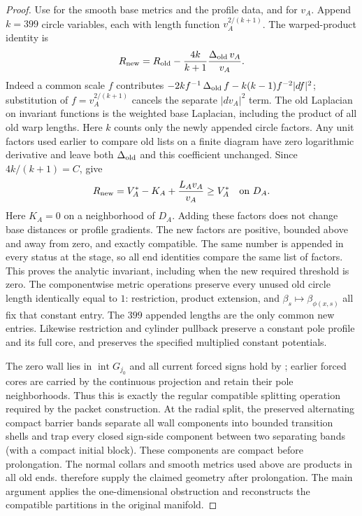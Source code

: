 \begin{proof}
Use  for the
smooth base metrics and the profile data, and
 for $v_A$.  Append
$k=399$ circle variables, each with length function
$v_A^{2/(k+1)}$.  The warped-product identity is
\[
 R_{\rm new}=R_{\rm old}-\frac{4k}{k+1}
                    \frac{\operatorname{\Delta}_{\rm old}v_A}{v_A}.
\]
Indeed a common scale $f$ contributes
$-2k f^{-1}\operatorname{\Delta}_{\rm old}f-k(k-1)f^{-2}|df|^2$; substitution of
$f=v_A^{2/(k+1)}$ cancels the separate $|dv_A|^2$ term.
The old Laplacian on invariant functions is the weighted base
Laplacian, including the product of all old warp lengths.  Here $k$ counts only the newly appended circle factors. Any unit
factors used earlier to compare old lists on a finite diagram have
zero logarithmic derivative and leave both $\operatorname{\Delta}_{\rm old}$ and this
coefficient unchanged. Since $4k/(k+1)=C$,  give
\[
 R_{\rm new}=V_A^*-K_A+\frac{L_Av_A}{v_A}
 \ge V_A^*\quad\hbox{on }D_A.
\]
Here $K_A=0$ on a neighborhood of $D_A$.  Adding these factors does
not change base distances or profile gradients.  The new factors
are positive, bounded above and away from zero, and exactly compatible.
The same number is appended in every status at the stage, so all
end identities compare the same list of factors.  This proves the
analytic invariant, including when the new required threshold is zero.
The componentwise metric operations preserve every unused old circle
length identically equal to $1$: restriction, product extension, and
$\beta_s\mapsto\beta_{\phi(x,s)}$ all fix that constant entry.  The
$399$ appended lengths are the only common new entries.  Likewise
restriction and cylinder pullback preserve a constant pole profile and
its full core, and  preserves the
specified multiplied constant potentials.

The zero wall lies in $\operatorname{int}G_{j_0}$ and all current
forced signs hold by ; earlier forced cores
are carried by the continuous projection and retain their pole
neighborhoods.  Thus this is exactly the regular compatible splitting
operation required by the packet construction.  At the radial split,
the preserved alternating compact barrier bands separate all wall
components into bounded transition shells and trap every closed
sign-side component between two separating bands (with a compact
initial block).  These components are compact before prolongation.
The normal collars and smooth metrics used above are products in all
old ends.   therefore supply the
claimed geometry after prolongation.  The main argument applies the
one-dimensional obstruction and reconstructs the compatible partitions in the original manifold.
\end{proof}
